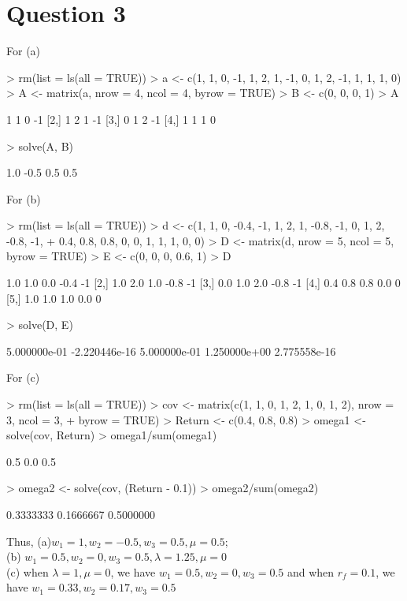 \documentclass[a4paper,12pt]{article}
\begin{document}
\section*{Question 3}
\noindent For (a)
\begin{Schunk}
\begin{Sinput}
> rm(list = ls(all = TRUE))
> a <- c(1, 1, 0, -1, 1, 2, 1, -1, 0, 1, 2, -1, 1, 1, 1, 0)
> A <- matrix(a, nrow = 4, ncol = 4, byrow = TRUE)
> B <- c(0, 0, 0, 1)
> A
\end{Sinput}
\begin{Soutput}
     [,1] [,2] [,3] [,4]
[1,]    1    1    0   -1
[2,]    1    2    1   -1
[3,]    0    1    2   -1
[4,]    1    1    1    0
\end{Soutput}
\begin{Sinput}
> solve(A, B)
\end{Sinput}
\begin{Soutput}
[1]  1.0 -0.5  0.5  0.5
\end{Soutput}
\end{Schunk}
\noindent For (b)
\begin{Schunk}
\begin{Sinput}
> rm(list = ls(all = TRUE))
> d <- c(1, 1, 0, -0.4, -1, 1, 2, 1, -0.8, -1, 0, 1, 2, -0.8, -1, 
+     0.4, 0.8, 0.8, 0, 0, 1, 1, 1, 0, 0)
> D <- matrix(d, nrow = 5, ncol = 5, byrow = TRUE)
> E <- c(0, 0, 0, 0.6, 1)
> D
\end{Sinput}
\begin{Soutput}
     [,1] [,2] [,3] [,4] [,5]
[1,]  1.0  1.0  0.0 -0.4   -1
[2,]  1.0  2.0  1.0 -0.8   -1
[3,]  0.0  1.0  2.0 -0.8   -1
[4,]  0.4  0.8  0.8  0.0    0
[5,]  1.0  1.0  1.0  0.0    0
\end{Soutput}
\begin{Sinput}
> solve(D, E)
\end{Sinput}
\begin{Soutput}
[1]  5.000000e-01 -2.220446e-16  5.000000e-01  1.250000e+00  2.775558e-16
\end{Soutput}
\end{Schunk}
\noindent For (c)
\begin{Schunk}
\begin{Sinput}
> rm(list = ls(all = TRUE))
> cov <- matrix(c(1, 1, 0, 1, 2, 1, 0, 1, 2), nrow = 3, ncol = 3, 
+     byrow = TRUE)
> Return <- c(0.4, 0.8, 0.8)
> omega1 <- solve(cov, Return)
> omega1/sum(omega1)
\end{Sinput}
\begin{Soutput}
[1] 0.5 0.0 0.5
\end{Soutput}
\begin{Sinput}
> omega2 <- solve(cov, (Return - 0.1))
> omega2/sum(omega2)
\end{Sinput}
\begin{Soutput}
[1] 0.3333333 0.1666667 0.5000000
\end{Soutput}
\end{Schunk}
Thus, (a)$w_1 = 1, w_2 = -0.5,w_3 =0.5, \mu=0.5$;\\
\noindent (b) $w_1=0.5, w_2 =0, w_3=0.5, \lambda=1.25, \mu=0$\\
\noindent (c) when $\lambda=1, \mu=0$, we have $w_1 =0.5, w_2 =0, w_3 =0.5$
and when $r_f =0.1$, we have $w_1 = 0.33, w_2 = 0.17, w_3 = 0.5$
\end{document}

